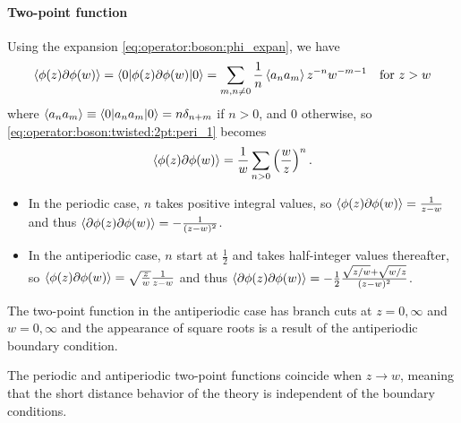 \documentclass[10pt]{article}
\begin{document}
\paragraph{Two-point function}
Using the expansion \cref{eq:operator:boson:phi_expan}, we have 
\begin{align}
    \expval{\phi(z)\partial\phi(w)}=\ev**{\phi(z)\partial\phi(w)}{0}=\sum_{m,n\neq0}\frac{1}{n}\expval{a_n a_m}z^{-n}w^{-m-1}\quad\text{for}\ z>w\label{eq:operator:boson:twisted:2pt:peri_1}
\end{align}
where $\expval{a_n a_m}\equiv\ev**{a_n a_m}{0}=n\delta_{n+m}$ if $n>0$, and 0 otherwise, so \cref{eq:operator:boson:twisted:2pt:peri_1} becomes 
\begin{align}
    \expval{\phi(z)\partial\phi(w)}=\frac{1}{w}\sum_{n>0}\left(\frac{w}{z}\right)^n.
\end{align}
\begin{itemize}
    \item In the periodic case, $n$ takes positive integral values, so $\expval{\phi(z)\partial\phi(w)}=\frac{1}{z-w}$ and thus $\expval{\partial\phi(z)\partial\phi(w)}=-\frac{1}{(z-w)^2}$.
    \item In the antiperiodic case, $n$ start at $\frac{1}{2}$ and takes half-integer values thereafter, so $\expval{\phi(z)\partial\phi(w)}=\sqrt{\frac{z}{w}}\frac{1}{z-w}$ and thus $\expval{\partial\phi(z)\partial\phi(w)}=-\frac{1}{2}\frac{\sqrt{z/w}+\sqrt{w/z}}{(z-w)^2}$.
\end{itemize}
\begin{remark}
    The two-point function in the antiperiodic case has branch cuts at $z=0,\infty$ and $w=0,\infty$ and the appearance of square roots is a result of the antiperiodic boundary condition.

    The periodic and antiperiodic two-point functions coincide when $z\to w$, meaning that the short distance behavior of the theory is independent of the boundary conditions.
\end{remark}
\end{document}
